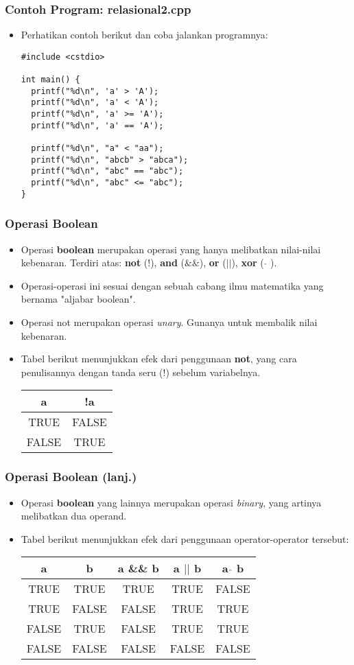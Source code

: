 \begin{frame}[fragile]
\frametitle{Contoh Program: relasional2.cpp}
\begin{itemize}
  \item Perhatikan contoh berikut dan coba jalankan programnya:
\begin{lstlisting}
#include <cstdio>

int main() {
  printf("%d\n", 'a' > 'A');
  printf("%d\n", 'a' < 'A');
  printf("%d\n", 'a' >= 'A');
  printf("%d\n", 'a' == 'A');

  printf("%d\n", "a" < "aa");
  printf("%d\n", "abcb" > "abca");
  printf("%d\n", "abc" == "abc");
  printf("%d\n", "abc" <= "abc");
}
\end{lstlisting}
\end{itemize}
\end{frame}

\begin{frame}
\frametitle{Operasi Boolean}
\begin{itemize}
  \item Operasi \textbf{boolean} merupakan operasi yang hanya melibatkan nilai-nilai kebenaran. Terdiri atas: \textbf{not} (!), \textbf{and} ($\&\&$), \textbf{or} ($||$), \textbf{xor} ( $\widehat{}$ ).
  \item Operasi-operasi ini sesuai dengan sebuah cabang ilmu matematika yang bernama "aljabar boolean".
  \item Operasi \alert{not} merupakan operasi \textit{unary}. Gunanya untuk membalik nilai kebenaran.
  \item Tabel berikut menunjukkan efek dari penggunaan \textbf{not}, yang cara penulisannya dengan tanda seru (!) sebelum variabelnya.
  \begin{tabular}{|c|c|}
  \hline a & !a \\
  \hline TRUE & FALSE \\
  \hline FALSE & TRUE \\
  \hline
  \end{tabular}
\end{itemize}
\end{frame}

\begin{frame}
\frametitle{Operasi Boolean (lanj.)}
\begin{itemize}
  \item Operasi \textbf{boolean} yang lainnya merupakan operasi \textit{binary}, yang artinya melibatkan dua operand.
  \item Tabel berikut menunjukkan efek dari penggunaan operator-operator tersebut:
  \begin{tabular}{|c|c|c|c|c|}
  \hline a & b & a \&\& b & a $||$ b & a $\widehat{}$ b \\
  \hline TRUE & TRUE & TRUE & TRUE & FALSE \\
  \hline TRUE & FALSE & FALSE & TRUE & TRUE \\
  \hline FALSE & TRUE & FALSE & TRUE & TRUE\\
  \hline FALSE & FALSE & FALSE & FALSE & FALSE \\
  \hline
  \end{tabular}
\end{itemize}
\end{frame}

